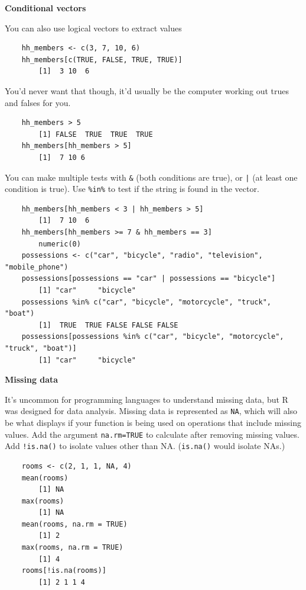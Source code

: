 \documentclass[12pt]{article}
\begin{document}
\textbf{Conditional vectors}

You can also use logical vectors to extract values
\vspace{-0.5em}\begin{verbatim}
    hh_members <- c(3, 7, 10, 6)
    hh_members[c(TRUE, FALSE, TRUE, TRUE)]
        [1]  3 10  6
\end{verbatim}
\vspace{-0.5em}
You'd never want that though, it'd usually be the computer working out trues and falses for you. 
\vspace{-0.5em}\begin{verbatim}
    hh_members > 5 
        [1] FALSE  TRUE  TRUE  TRUE
    hh_members[hh_members > 5]
        [1]  7 10 6
\end{verbatim}
\vspace{-0.5em}
You can make multiple tests with \texttt{\&} (both conditions are true), or \texttt{|} (at least one condition is true). Use \texttt{\%in\%} to test if the string is found in the vector.
\vspace{-0.5em}\begin{verbatim}
    hh_members[hh_members < 3 | hh_members > 5]
        [1]  7 10  6
    hh_members[hh_members >= 7 & hh_members == 3]
        numeric(0)
    possessions <- c("car", "bicycle", "radio", "television", "mobile_phone")
    possessions[possessions == "car" | possessions == "bicycle"]
        [1] "car"     "bicycle"
    possessions %in% c("car", "bicycle", "motorcycle", "truck", "boat")
        [1]  TRUE  TRUE FALSE FALSE FALSE
    possessions[possessions %in% c("car", "bicycle", "motorcycle", "truck", "boat")]
        [1] "car"     "bicycle"
\end{verbatim}
\vspace{-0.5em}

\newpage \textbf{Missing data}

It's uncommon for programming languages to understand missing data, but R was designed for data analysis. Missing data is represented as \texttt{NA}, which will also be what displays if your function is being used on operations that include missing values. Add the argument \texttt{na.rm=TRUE} to calculate after removing missing values. Add \texttt{!is.na()} to isolate values other than NA. (\texttt{is.na()} would isolate NAs.)

\vspace{-0.5em}\begin{verbatim}
    rooms <- c(2, 1, 1, NA, 4)
    mean(rooms)
        [1] NA
    max(rooms)
        [1] NA
    mean(rooms, na.rm = TRUE)
        [1] 2
    max(rooms, na.rm = TRUE)
        [1] 4
    rooms[!is.na(rooms)]
        [1] 2 1 1 4
\end{verbatim}\vspace{-0.5em}
\end{document}
